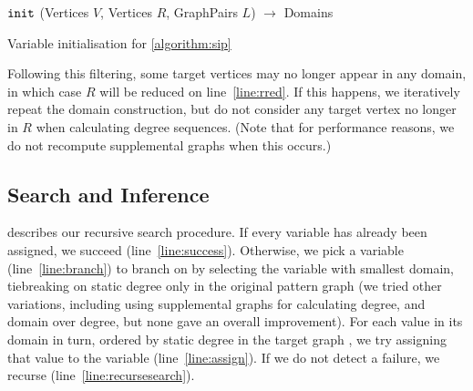 \documentclass{llncs}
\newcommand{\lineref}[1]{line~\ref{#1}}
\begin{document}
\begin{algorithm}[b]
\DontPrintSemicolon
\nl $\FuncSty{init}$ (Vertices $V$, Vertices $R$, GraphPairs $L$) $\rightarrow$ Domains \;
\nl {}
\caption{Variable initialisation for \cref{algorithm:sip}}
\label{algorithm:init}
\end{algorithm}

Following this filtering, some target vertices may no longer appear in any domain, in which case $R$
will be reduced on \lineref{line:rred}. If this happens, we iteratively repeat the domain
construction, but do not consider any target vertex no longer in $R$ when calculating degree
sequences. (Note that for performance reasons, we do not recompute supplemental graphs when this
occurs.)

\subsection{Search and Inference}

 describes our recursive search procedure. If every variable has already been
assigned, we succeed (\lineref{line:success}). Otherwise, we pick a variable (\lineref{line:branch})
to branch on by selecting the variable with smallest domain, tiebreaking on static degree only in
the original pattern graph (we tried other variations, including using supplemental graphs for
calculating degree, and domain over degree, but none gave an overall improvement).  For each value
in its domain in turn, ordered by static degree in the target graph \cite{Geelen:1992}, we try
assigning that value to the variable (\lineref{line:assign}). If we do not detect a failure, we
recurse (\lineref{line:recursesearch}).
\end{document}
